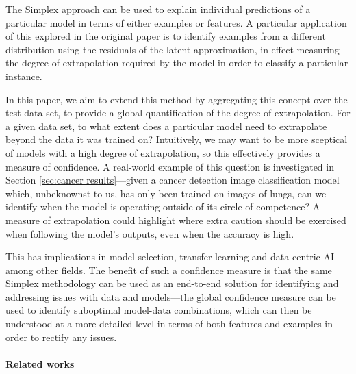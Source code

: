 \documentclass{article}
\begin{document}
The Simplex approach \cite{crabbe_explaining_2021} can be used to explain individual predictions of a particular model in terms of either examples or features. A particular application of this explored in the original paper is to identify examples from a different distribution using the residuals of the latent approximation, in effect measuring the degree of extrapolation required by the model in order to classify a particular instance.

In this paper, we aim to extend this method by aggregating this concept over the test data set, to provide a global quantification of the degree of extrapolation. For a given data set, to what extent does a particular model need to extrapolate beyond the data it was trained on? Intuitively, we may want to be more sceptical of models with a high degree of extrapolation, so this effectively provides a measure of confidence.
A real-world example of this question is investigated in Section \ref{sec:cancer results}---given a cancer detection image classification model which, unbeknownst to us, has only been trained on images of lungs, can we identify when the model is operating outside of its circle of competence? A measure of extrapolation could highlight where extra caution should be exercised when following the model's outputs, even when the accuracy is high.

This has implications in model selection, transfer learning and data-centric AI among other fields. The benefit of such a confidence measure is that the same Simplex methodology can be used as an end-to-end solution for identifying and addressing issues with data and models---the global confidence measure can be used to identify suboptimal model-data combinations, which can then be understood at a more detailed level in terms of both features and examples in order to rectify any issues.


\paragraph{Related works}
\end{document}
